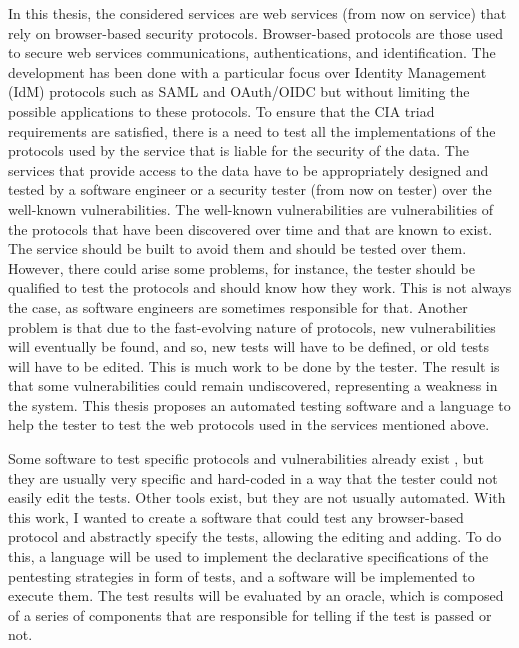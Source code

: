 In this thesis, the considered services are web services (from now on service) that rely on browser-based security protocols. Browser-based protocols are those used to secure web services communications, authentications, and identification. The development has been done with a particular focus over Identity Management (IdM) protocols such as \gls{SAML} and \gls{OAuth}/OIDC but without limiting the possible applications to these protocols.
To ensure that the CIA triad requirements are satisfied, there is a need to test all the implementations of the protocols used by the service that is liable for the security of the data. The services that provide access to the data have to be appropriately designed and tested by a software engineer or a security tester (from now on tester) over the well-known vulnerabilities. The well-known vulnerabilities are vulnerabilities of the protocols that have been discovered over time and that are known to exist. The service should be built to avoid them and should be tested over them. However, there could arise some problems, for instance, the tester should be qualified to test the protocols and should know how they work. This is not always the case, as software engineers are sometimes responsible for that. Another problem is that due to the fast-evolving nature of protocols, new vulnerabilities will eventually be found, and so, new tests will have to be defined, or old tests will have to be edited. This is much work to be done by the tester. The result is that some vulnerabilities could remain undiscovered, representing a weakness in the system. This thesis proposes an automated testing software and a language to help the tester to test the web protocols used in the services mentioned above. 

Some software to test specific protocols and vulnerabilities already exist \cite{wendy_barreto,claudio_grisenti}, but they are usually very specific and hard-coded in a way that the tester could not easily edit the tests. Other tools exist, but they are not usually automated. With this work, I wanted to create a software that could test any browser-based protocol and abstractly specify the tests, allowing the editing and adding. To do this, a language will be used to implement the declarative specifications of the pentesting strategies in form of tests, and a software will be implemented to execute them. The test results will be evaluated by an oracle, which is composed of a series of components that are responsible for telling if the test is passed or not.

